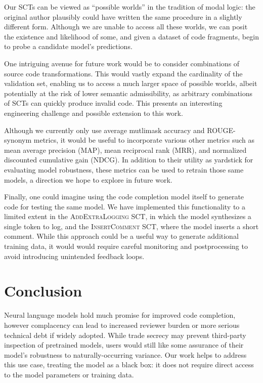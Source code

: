\documentclass[usenames,dvipsnames]{article} %
\begin{document}
  Our SCTs can be viewed as ``possible worlds'' in the tradition of modal logic: the original author plausibly could have written the same procedure in a slightly different form. Although we are unable to access all these worlds, we can posit the existence and likelihood of some, and given a dataset of code fragments, begin to probe a candidate model's predictions.

  One intriguing avenue for future work would be to consider combinations of source code transformations. This would vastly expand the cardinality of the validation set, enabling us to access a much larger space of possible worlds, albeit potentially at the risk of lower semantic admissibility, as arbitrary combinations of SCTs can quickly produce invalid code. This presents an interesting engineering challenge and possible extension to this work.

  Although we currently only use average mutlimask accuracy and ROUGE-synonym metrics, it would be useful to incorporate various other metrics such as mean average precision (MAP), mean reciprocal rank (MRR), and normalized discounted cumulative gain (NDCG). In addition to their utility as yardstick for evaluating model robustness, these metrics can be used to retrain those same models, a direction we hope to explore in future work.

  Finally, one could imagine using the code completion model itself to generate code for testing the same model. We have implemented this functionality to a limited extent in the \textsc{AddExtraLogging} SCT, in which the model synthesizes a single token to log, and the \textsc{InsertComment} SCT, where the model inserts a short comment. While this approach could be a useful way to generate additional training data, it would would require careful monitoring and postprocessing to avoid introducing unintended feedback loops.

  \section{Conclusion}\label{sec:conclusion}

  Neural language models hold much promise for improved code completion, however complacency can lead to increased reviewer burden or more serious technical debt if widely adopted. While trade secrecy may prevent third-party inspection of pretrained models, users would still like some assurance of their model's robustness to naturally-occurring variance. Our work helps to address this use case, treating the model as a black box: it does not require direct access to the model parameters or training data.
\end{document}
